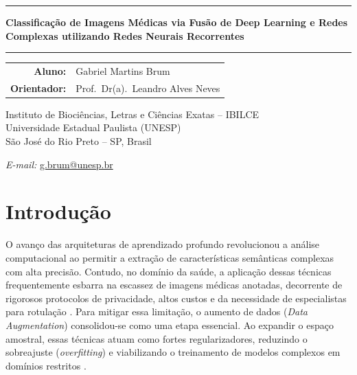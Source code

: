\documentclass[a4paper,12pt]{article}
\begin{document}
\begin{center}

\rule{\textwidth}{0.6pt}
\vspace{0.01cm}

{\Large\bfseries
Classificação de Imagens Médicas via Fusão de Deep Learning e Redes Complexas utilizando Redes Neurais Recorrentes}

\rule{\textwidth}{0.6pt}

\vspace{0.5cm}

\begin{tabular}{rl}
\textbf{Aluno:} & Gabriel Martins Brum \\[4pt]
\textbf{Orientador:} & Prof.\ Dr(a).\ Leandro Alves Neves \\[8pt]
\end{tabular}

Instituto de Biociências, Letras e Ciências Exatas -- IBILCE \\
\vspace{2pt}
Universidade Estadual Paulista (UNESP) \\
\vspace{2pt}
São José do Rio Preto -- SP, Brasil \\

\vspace{0.1cm}

\textit{E-mail:} \href{mailto:g.brum@unesp.br}{g.brum@unesp.br}

\end{center}

\vspace{1cm}

\section{Introdução}

O avanço das arquiteturas de aprendizado profundo revolucionou a análise computacional ao permitir a extração de características semânticas complexas com alta precisão. Contudo, no domínio da saúde, a aplicação dessas técnicas frequentemente esbarra na escassez de imagens médicas anotadas, decorrente de rigorosos protocolos de privacidade, altos custos e da necessidade de especialistas para rotulação \cite{litjens2017survey}. Para mitigar essa limitação, o aumento de dados (\textit{Data Augmentation}) consolidou-se como uma etapa essencial. Ao expandir o espaço amostral, essas técnicas atuam como fortes regularizadores, reduzindo o sobreajuste (\textit{overfitting}) e viabilizando o treinamento de modelos complexos em domínios restritos \cite{perez2017effectiveness, shorten2019survey}.
\end{document}
